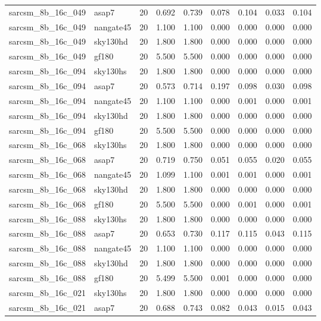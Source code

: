 \begin{tabular}{llrrrrrrr}
sarcsm\_8b\_16c\_049 & asap7 & 20 & 0.692 & 0.739 & 0.078 & 0.104 & 0.033 & 0.104 \\
sarcsm\_8b\_16c\_049 & nangate45 & 20 & 1.100 & 1.100 & 0.000 & 0.000 & 0.000 & 0.000 \\
sarcsm\_8b\_16c\_049 & sky130hd & 20 & 1.800 & 1.800 & 0.000 & 0.000 & 0.000 & 0.000 \\
sarcsm\_8b\_16c\_049 & gf180 & 20 & 5.500 & 5.500 & 0.000 & 0.000 & 0.000 & 0.000 \\
sarcsm\_8b\_16c\_094 & sky130hs & 20 & 1.800 & 1.800 & 0.000 & 0.000 & 0.000 & 0.000 \\
sarcsm\_8b\_16c\_094 & asap7 & 20 & 0.573 & 0.714 & 0.197 & 0.098 & 0.030 & 0.098 \\
sarcsm\_8b\_16c\_094 & nangate45 & 20 & 1.100 & 1.100 & 0.000 & 0.001 & 0.000 & 0.001 \\
sarcsm\_8b\_16c\_094 & sky130hd & 20 & 1.800 & 1.800 & 0.000 & 0.000 & 0.000 & 0.000 \\
sarcsm\_8b\_16c\_094 & gf180 & 20 & 5.500 & 5.500 & 0.000 & 0.000 & 0.000 & 0.000 \\
sarcsm\_8b\_16c\_068 & sky130hs & 20 & 1.800 & 1.800 & 0.000 & 0.000 & 0.000 & 0.000 \\
sarcsm\_8b\_16c\_068 & asap7 & 20 & 0.719 & 0.750 & 0.051 & 0.055 & 0.020 & 0.055 \\
sarcsm\_8b\_16c\_068 & nangate45 & 20 & 1.099 & 1.100 & 0.001 & 0.001 & 0.000 & 0.001 \\
sarcsm\_8b\_16c\_068 & sky130hd & 20 & 1.800 & 1.800 & 0.000 & 0.000 & 0.000 & 0.000 \\
sarcsm\_8b\_16c\_068 & gf180 & 20 & 5.500 & 5.500 & 0.000 & 0.001 & 0.000 & 0.001 \\
sarcsm\_8b\_16c\_088 & sky130hs & 20 & 1.800 & 1.800 & 0.000 & 0.000 & 0.000 & 0.000 \\
sarcsm\_8b\_16c\_088 & asap7 & 20 & 0.653 & 0.730 & 0.117 & 0.115 & 0.043 & 0.115 \\
sarcsm\_8b\_16c\_088 & nangate45 & 20 & 1.100 & 1.100 & 0.000 & 0.000 & 0.000 & 0.000 \\
sarcsm\_8b\_16c\_088 & sky130hd & 20 & 1.800 & 1.800 & 0.000 & 0.000 & 0.000 & 0.000 \\
sarcsm\_8b\_16c\_088 & gf180 & 20 & 5.499 & 5.500 & 0.001 & 0.000 & 0.000 & 0.000 \\
sarcsm\_8b\_16c\_021 & sky130hs & 20 & 1.800 & 1.800 & 0.000 & 0.000 & 0.000 & 0.000 \\
sarcsm\_8b\_16c\_021 & asap7 & 20 & 0.688 & 0.743 & 0.082 & 0.043 & 0.015 & 0.043 \\

\end{tabular}

